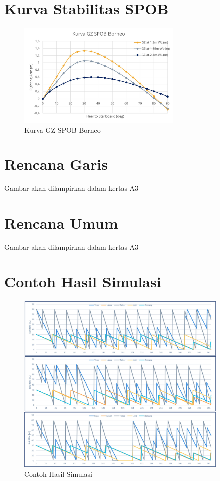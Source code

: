 \section*{Kurva Stabilitas SPOB}
\label{sec:kurva-gz-spob}

\begin{figure}
    \centering
    \includegraphics[width=0.7\textwidth]{grafik/kurva-gz-spob.jpg}
    \caption*{Kurva GZ SPOB Borneo}
    \label{fig:kurva-gz-spob}
\end{figure}

\newpage

\section*{Rencana Garis}
\label{sec:rencana-garis}

Gambar akan dilampirkan dalam kertas A3


\section*{Rencana Umum}
\label{sec:rencana-umum}

Gambar akan dilampirkan dalam kertas A3

\section*{Contoh Hasil Simulasi}
\label{sec:contoh-hasil-simulasi}

\begin{figure}
    \centering
    \includegraphics[width=0.9\textwidth]{grafik/contoh-hasil-simulasi.jpg}
    \caption*{Contoh Hasil Simulasi}
    \label{fig:contoh-simulasi}
\end{figure}

